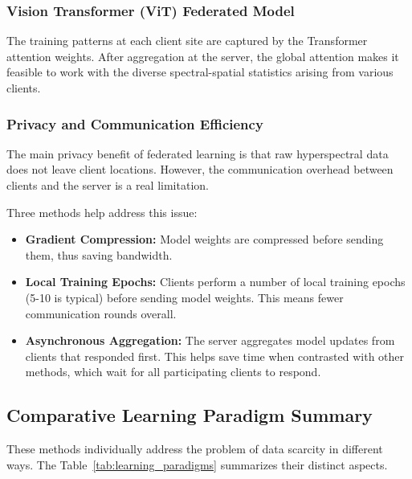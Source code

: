 \subsubsection{Vision Transformer (ViT) Federated Model}
The training patterns at each client site are captured by the Transformer attention weights. After aggregation at the server, the global attention makes it feasible to work with the diverse spectral-spatial statistics arising from various clients.

\subsubsection{Privacy and Communication Efficiency}
The main privacy benefit of federated learning is that raw hyperspectral data does not leave client locations. However, the communication overhead between clients and the server is a real limitation.

Three methods help address this issue:
\begin{itemize}
    \item \textbf{Gradient Compression:} Model weights are compressed before sending them, thus saving bandwidth.
    \item \textbf{Local Training Epochs:} Clients perform a number of local training epochs (5-10 is typical) before sending model weights. This means fewer communication rounds overall.
    \item \textbf{Asynchronous Aggregation:} The server aggregates model updates from clients that responded first. This helps save time when contrasted with other methods, which wait for all participating clients to respond.
\end{itemize}

\subsection{Comparative Learning Paradigm Summary}
These methods individually address the problem of data scarcity in different ways. The Table~\ref{tab:learning_paradigms} summarizes their distinct aspects.

